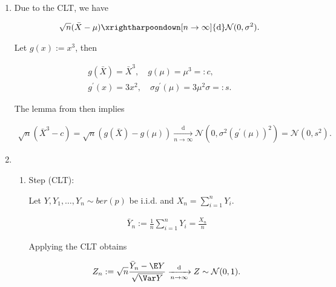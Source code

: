\begin{solution}

\phantom{}

\begin{enumerate}[label = (\alph*)]

    \item Due to the CLT, we have \cite[Lecture 4, Slide 59]{EStat}
    
    \begin{align*}
        \sqrt n (\bar X - \mu) \xrightharpoondown[n \to \infty]{\mathrm d} \mathcal N(0, \sigma^2).
    \end{align*}

    Let $g(x) := x^3$, then

    \begin{gather*}
        g(\bar X) = \bar X ^3, \quad g(\mu) = \mu^3 =: c, \\
        g^\prime(x) = 3 x^2, \quad \sigma g^\prime(\mu) = 3 \mu^2 \sigma =: s.
    \end{gather*}

    The lemma from \cite*[Lecture 5, Slide 10]{EStat} then implies

    \begin{align*}
        \sqrt n (\bar X^3 - c)
        =
        \sqrt n (g(\bar X) - g(\mu))
        \xrightarrow[n \to \infty]{\mathrm d}
        \mathcal N(0, \sigma^2 (g^\prime(\mu))^2)
        =
        \mathcal N(0, s^2).
    \end{align*}

    \item

    \begin{enumerate}[label = \arabic*.]

        \item Step (CLT):
        
        Let $Y, Y_1, \dots, Y_n \sim \mathit{ber}(p)$ be i.i.d. and $X_n = \sum_{i=1}^n Y_i$.

        \begin{align*}
            \bar Y_n := \frac{1}{n} \sum_{i=1}^n Y_i = \frac{X_n}{n}
        \end{align*}

        Applying the CLT obtains

        \begin{align*}
            Z_n
            :=
            \sqrt n \frac{\bar Y_n - \E Y}{\sqrt{\Var Y}}
            \xrightarrow[n \to \infty]{\mathrm d}
            Z
            \sim
            \mathcal N(0, 1).
        \end{align*}


\end{enumerate}
\end{enumerate}
\end{solution}
